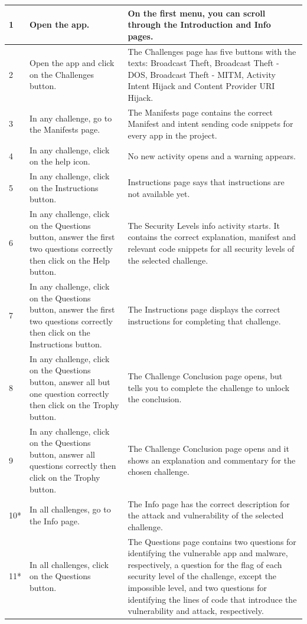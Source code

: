 \begin{center}
\begin{longtable}{|p{0.4cm} |p{5.2cm} |p{7.4cm} |}
         \hline
         1 & Open the app. & On the first menu, you can scroll through the Introduction and Info pages. \\
         \hline
         2 & Open the app and click on the Challenges button. & The Challenges page has five buttons with the texts: Broadcast Theft, Broadcast Theft - DOS, Broadcast Theft - MITM, Activity Intent Hijack and Content Provider URI Hijack. \\
         \hline
         3 & In any challenge, go to the Manifests page. & The Manifests page contains the correct Manifest and intent sending code snippets for every app in the project. \\
         \hline
         4 & In any challenge, click on the help icon. & No new activity opens and a warning appears. \\
         \hline
         5 & In any challenge, click on the Instructions button. & Instructions page says that instructions are not available yet.\\
         \hline
         6 & In any challenge, click on the Questions button, answer the first two questions correctly then click on the Help button. & The Security Levels info activity starts. It contains the correct explanation, manifest and relevant code snippets for all security levels of the selected challenge.\\
         \hline
         7 & In any challenge, click on the Questions button, answer the first two questions correctly then click on the Instructions button. & The Instructions page displays the correct instructions for completing that challenge.\\
         \hline
         8 & In any challenge, click on the Questions button, answer all but one question correctly then click on the Trophy button. & The Challenge Conclusion page opens, but tells you to complete the challenge to unlock the conclusion.\\
         \hline
         9 & In any challenge, click on the Questions button, answer all questions correctly then click on the Trophy button. & The Challenge Conclusion page opens and it shows an explanation and commentary for the chosen challenge.\\
         \hline
         10* & In all challenges, go to the Info page. & The Info page has the correct description for the attack and vulnerability of the selected challenge. \\
         \hline
         11* & In all challenges, click on the Questions button. & The Questions page contains two questions for identifying the vulnerable app and malware, respectively, a question for the flag of each security level of the challenge, except the impossible level, and two questions for identifying the lines of code that introduce the vulnerability and attack, respectively. \\

\end{longtable}
\end{center}
